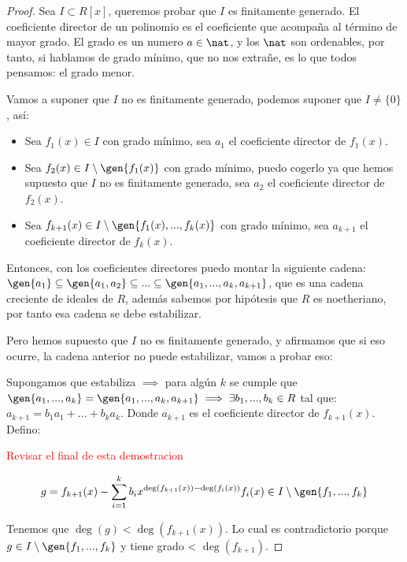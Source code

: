 \begin{proof}
	Sea $I \subset R[x]$, queremos probar que $I$ es finitamente generado. 
	\nota El coeficiente director de un polinomio es el coeficiente que acompaña al término de mayor grado.
	\nota El grado es un numero $a \in \nat$, y los $\nat$ son ordenables, por tanto, si hablamos de grado mínimo, que no nos extrañe, es lo que todos pensamos: el grado menor.
	
	Vamos a suponer que $I$ no es finitamente generado, podemos suponer que $I\neq \{0\}$, así:
	\begin{itemize}
		\item Sea $f_1(x) \in I$ con grado mínimo, sea $a_1$ el coeficiente director de $f_1(x)$.
		\item Sea $f_2(x) \in I\setminus \gen{f_1(x)}$ con grado mínimo, puedo cogerlo ya que hemos supuesto que $I$ no es finitamente generado, sea $a_2$ el coeficiente director de $f_2(x)$.
		\item Sea $f_{k+1}(x) \in I\setminus \gen{f_1(x),...,f_k(x)}$ con grado mínimo, sea $a_{k+1}$ el coeficiente director de $f_k(x)$.
	\end{itemize}
	
	Entonces, con los coeficientes directores puedo montar la siguiente cadena: $\gen{a_1} \subseteq \gen{a_1,a_2} \subseteq ... \subseteq \gen{a_1,...,a_k,a_{k+1}}$, que es una cadena creciente de ideales de $R$, además sabemos por hipótesis que $R$ es noetheriano, por tanto esa cadena se debe estabilizar.
	
	Pero hemos supuesto que $I$ no es finitamente generado, y afirmamos que si eso ocurre, la cadena anterior no puede estabilizar, vamos a probar eso:
	
	Supongamos que estabiliza $\implies$ para algún $k$ se cumple que $\gen{a_1,...,a_k}=\gen{a_1,...,a_k,a_{k+1}} \implies \exists b_1,...,b_k \in R$ tal que: $a_{k+1}=b_1a_1+...+b_ka_k$. Donde $a_{k+1}$ es el coeficiente director de $f_{k+1}(x)$. Defino:
	
	\textcolor{red}{Revisar el final de esta demostracion}
	
	$$ g=f_{k+1}(x)-\sum_{i=1}^{k}b_ix^{\deg(f_{k+1}(x))-\deg(f_i(x))} f_i(x) \in I\setminus \gen{f_1,...,f_k} $$
	
	
	Tenemos que $\deg(g) < \deg(f_{k+1}(x))$. Lo cual es contradictorio porque $g \in I \setminus \gen{f_1,...,f_k}$ y tiene grado < $\deg(f_{k+1})$.
	
\end{proof}

